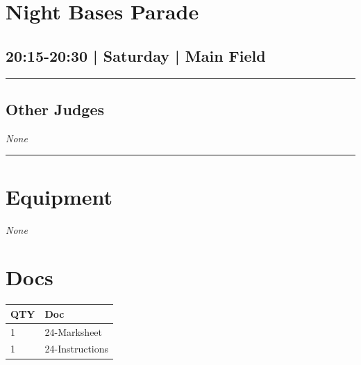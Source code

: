 \documentclass[10pt, A5]{article}
\begin{document}
        \begin{framed}
        \begin{minipage}{\textwidth}

        \setcounter{section}{40}
        \section{Night Bases Parade}
        \subsection*{20:15-20:30 | Saturday | Main Field}

        \vspace{0.25cm}
        \hrule
        \vspace{0.25cm}


        \subsection*{Other Judges}
                \textit{None}

            \vspace{0.25cm}
        \hrule
        \vspace{0.25cm}

        \begin{multicols}{2}

		\section*{\faWrench \: Equipment}

				\textit{None}
		
		\vfill\null
		\columnbreak

			\section*{\faFile \: Docs}
		 	\begin{center}
			\begin{tabular}{p{2cm}p{4cm}}

			\textbf{QTY} & \textbf{Doc} \\\toprule
										1&24-Marksheet\\\midrule
										1&24-Instructions\\\midrule
							\end{tabular}
			\end{center}
	

		\vfill\null

		\end{multicols}
\end{minipage}
\end{framed}
\end{document}
